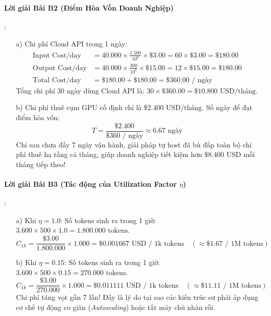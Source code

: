 \paragraph{Lời giải Bài B2 (Điểm Hòa Vốn Doanh Nghiệp)}:
\begin{itemize}
  \item[a)] Chi phí Cloud API trong 1 ngày:
  \begin{align*}
  \text{Input Cost/day} &= 40.000 \times \frac{1.500}{10^6} \times \$3.00 = 60 \times \$3.00 = \$180.00 \\
  \text{Output Cost/day} &= 40.000 \times \frac{300}{10^6} \times \$15.00 = 12 \times \$15.00 = \$180.00 \\
  \text{Total Cost/day} &= \$180.00 + \$180.00 = \$360.00\text{ / ngày}
  \end{align*}
  Tổng chi phí 30 ngày dùng Cloud API là: $30 \times \$360.00 = \$10.800\text{ USD/tháng}$.
  \item[b)] Chi phí thuê cụm GPU cố định chỉ là $\$2.400\text{ USD/tháng}$. Số ngày để đạt điểm hòa vốn:
  \begin{equation*}
  T = \frac{\$2.400}{\$360\text{ / ngày}} \approx 6.67\text{ ngày}
  \end{equation*}
  Chỉ sau chưa đầy 7 ngày vận hành, giải pháp tự host đã bù đắp toàn bộ chi phí thuê hạ tầng cả tháng, giúp doanh nghiệp tiết kiệm hơn $\$8.400\text{ USD}$ mỗi tháng tiếp theo!
\end{itemize}

\paragraph{Lời giải Bài B3 (Tác động của Utilization Factor $\eta$)}:
\begin{itemize}
  \item[a)] Khi $\eta = 1.0$:
  Số tokens sinh ra trong 1 giờ: $3.600 \times 500 \times 1.0 = 1.800.000\text{ tokens}$.
  \begin{equation*}
  C_{1k} = \frac{\$3.00}{1.800.000} \times 1.000 = \$0.001667\text{ USD / 1k tokens} \quad (\approx \$1.67\text{ / 1M tokens})
  \end{equation*}
  \item[b)] Khi $\eta = 0.15$:
  Số tokens sinh ra trong 1 giờ: $3.600 \times 500 \times 0.15 = 270.000\text{ tokens}$.
  \begin{equation*}
  C_{1k} = \frac{\$3.00}{270.000} \times 1.000 = \$0.011111\text{ USD / 1k tokens} \quad (\approx \$11.11\text{ / 1M tokens})
  \end{equation*}
  Chi phí tăng vọt gần 7 lần! Đây là lý do tại sao các kiến trúc sư phải áp dụng cơ chế tự động co giãn (\textit{Autoscaling}) hoặc tắt máy chủ nhàn rỗi.
\end{itemize}

